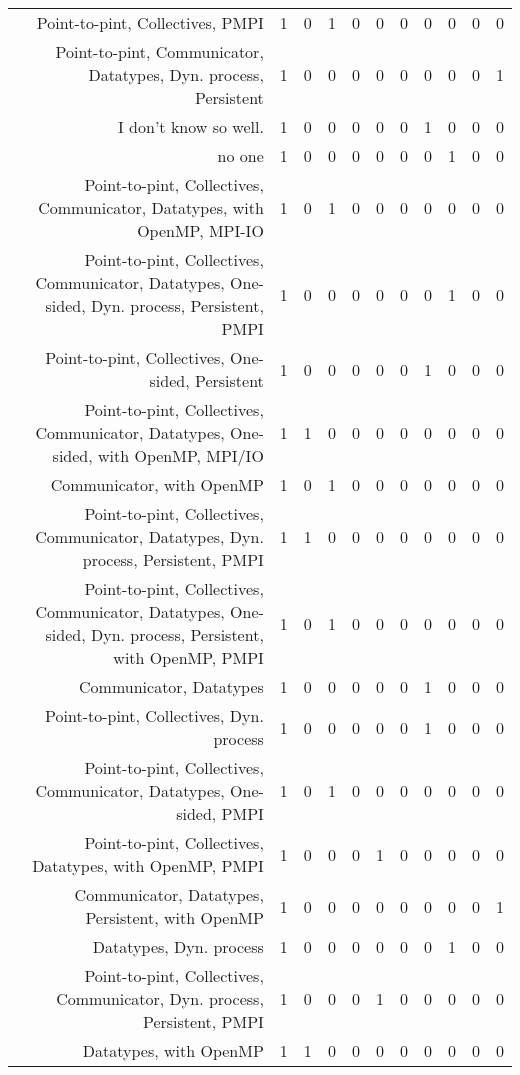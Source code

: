 {\begin{landscape}
\begin{longtable}[htb]{r|c|c|c|c|c|c|c|c|c|c}
{Point-to-pint, Collectives, PMPI} & 1 & 0 & 1 & 0 & 0 & 0 & 0 & 0 & 0 & 0 \\%
{Point-to-pint, Communicator, Datatypes, Dyn. process, Persistent} & 1 & 0 & 0 & 0 & 0 & 0 & 0 & 0 & 0 & 1 \\%
{I don't know so well.} & 1 & 0 & 0 & 0 & 0 & 0 & 1 & 0 & 0 & 0 \\%
{no one} & 1 & 0 & 0 & 0 & 0 & 0 & 0 & 1 & 0 & 0 \\%
{Point-to-pint, Collectives, Communicator, Datatypes, with OpenMP, MPI-IO} & 1 & 0 & 1 & 0 & 0 & 0 & 0 & 0 & 0 & 0 \\%
{Point-to-pint, Collectives, Communicator, Datatypes, One-sided, Dyn. process, Persistent, PMPI} & 1 & 0 & 0 & 0 & 0 & 0 & 0 & 1 & 0 & 0 \\%
{Point-to-pint, Collectives, One-sided, Persistent} & 1 & 0 & 0 & 0 & 0 & 0 & 1 & 0 & 0 & 0 \\%
{Point-to-pint, Collectives, Communicator, Datatypes, One-sided, with OpenMP, MPI/IO} & 1 & 1 & 0 & 0 & 0 & 0 & 0 & 0 & 0 & 0 \\%
{Communicator, with OpenMP} & 1 & 0 & 1 & 0 & 0 & 0 & 0 & 0 & 0 & 0 \\%
{Point-to-pint, Collectives, Communicator, Datatypes, Dyn. process, Persistent, PMPI} & 1 & 1 & 0 & 0 & 0 & 0 & 0 & 0 & 0 & 0 \\%
{Point-to-pint, Collectives, Communicator, Datatypes, One-sided, Dyn. process, Persistent, with OpenMP, PMPI} & 1 & 0 & 1 & 0 & 0 & 0 & 0 & 0 & 0 & 0 \\%
{Communicator, Datatypes} & 1 & 0 & 0 & 0 & 0 & 0 & 1 & 0 & 0 & 0 \\%
{Point-to-pint, Collectives, Dyn. process} & 1 & 0 & 0 & 0 & 0 & 0 & 1 & 0 & 0 & 0 \\%
{Point-to-pint, Collectives, Communicator, Datatypes, One-sided, PMPI} & 1 & 0 & 1 & 0 & 0 & 0 & 0 & 0 & 0 & 0 \\%
{Point-to-pint, Collectives, Datatypes, with OpenMP, PMPI} & 1 & 0 & 0 & 0 & 1 & 0 & 0 & 0 & 0 & 0 \\%
{Communicator, Datatypes, Persistent, with OpenMP} & 1 & 0 & 0 & 0 & 0 & 0 & 0 & 0 & 0 & 1 \\%
{Datatypes, Dyn. process} & 1 & 0 & 0 & 0 & 0 & 0 & 0 & 1 & 0 & 0 \\%
{Point-to-pint, Collectives, Communicator, Dyn. process, Persistent, PMPI} & 1 & 0 & 0 & 0 & 1 & 0 & 0 & 0 & 0 & 0 \\%
{Datatypes, with OpenMP} & 1 & 1 & 0 & 0 & 0 & 0 & 0 & 0 & 0 & 0 \\%

\end{longtable}
\end{landscape}}
